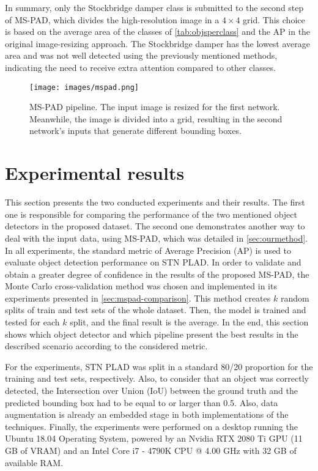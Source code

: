 \documentclass[10pt,conference]{IEEEtran}
\begin{document}
In summary, only the Stockbridge damper class is submitted to the second step of MS-PAD, which divides the high-resolution image in a $4\times4$ grid. This choice is based on the average area of the classes of \autoref{tab:objsperclass} and the AP in the original image-resizing approach. The Stockbridge damper has the lowest average area and was not well detected using the previously mentioned methods, indicating the need to receive extra attention compared to other classes.







\begin{figure}[htp]
    \centering
    \texttt{[image: images/mspad.png]}
    \caption{MS-PAD pipeline. The input image is resized for the first network. Meanwhile, the image is divided into a grid, resulting in the second network's inputs that generate different bounding boxes.}
    \label{fig:method}
\end{figure}







\section{Experimental results}
\label{sec:results}

This section presents the two conducted experiments and their results. The first one is responsible for comparing the performance of the two mentioned object detectors in the proposed dataset. The second one demonstrates another way to deal with the input data, using MS-PAD, which was detailed in \autoref{sec:ourmethod}. In all experiments, the standard metric of Average Precision (AP) is used to evaluate object detection performance on STN PLAD. In order to validate and obtain a greater degree of confidence in the results of the proposed MS-PAD, the Monte Carlo cross-validation method \cite{dubitzky2007fundamentals} was chosen and implemented in its experiments presented in \autoref{sec:mspad-comparison}. This method creates $k$ random splits of train and test sets of the whole dataset. Then, the model is trained and tested for each $k$ split, and the final result is the average. In the end, this section shows which object detector and which pipeline present the best results in the described scenario according to the considered metric.


For the experiments, STN PLAD was split in a standard 80/20 proportion for the training and test sets, respectively. Also, to consider that an object was correctly detected, the Intersection over Union (IoU) between the ground truth and the predicted bounding box had to be equal to or larger than 0.5. Also, data augmentation is already an embedded stage in both implementations of the techniques. Finally, the experiments were performed on a desktop running the Ubuntu 18.04 Operating System, powered by an Nvidia RTX 2080 Ti GPU (11 GB of VRAM) and an Intel Core i7 - 4790K CPU @ 4.00 GHz with 32 GB of available RAM. 
\end{document}
